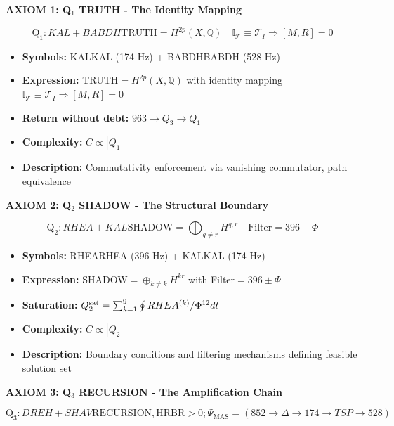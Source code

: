 \documentclass[11pt, letterpaper]{article}
\newcommand{\KAL}{\ensuremath{\mathop{\textnormal{\symbolafont\symbol{"2B21}}}}}    %
\newcommand{\BABDH}{\ensuremath{\mathop{\textnormal{\symbolafont\symbol{"2721}}}}}   %
\newcommand{\DREH}{\ensuremath{\mathop{\textnormal{\symbolafont\symbol{"29D7}}}}}   %
\newcommand{\RHEA}{\ensuremath{\mathop{\textnormal{\symbolafont\symbol{"229B}}}}}   %
\newcommand{\SHAV}{\ensuremath{\mathop{\textnormal{\symbolafont\symbol{"269B}}}}}   %
\def\KAL{KAL}%
\def\BABDH{BABDH}%
\def\DREH{DREH}%
\def\RHEA{RHEA}%
\def\SHAV{SHAV}%
\newcommand{\HRBR}{\ensuremath{\text{HRBR}}}
\begin{document}
\noindent\textbf{AXIOM 1: Q$_1$ TRUTH - The Identity Mapping}

\begin{equation}
\text{Q}_1:\KAL +\BABDH \text{TRUTH}=H^{2p}(X,\mathbb{Q})\quad \mathbb{I}_{\mathcal{T}}\equiv \mathcal{T}_I \Rightarrow[M,R]=0
\end{equation}

\begin{itemize}
    \item \textbf{Symbols:} \KAL KAL (174 Hz) + \BABDH BABDH (528 Hz)
    \item \textbf{Expression:} TRUTH$=H^{2p}(X,\mathbb{Q})$ with identity mapping $\mathbb{I}_{\mathcal{T}}\equiv\mathcal{T}_I\Rightarrow[M,R]=0$
    \item \textbf{Return without debt:} $963 \to Q_3 \to Q_1$
    \item \textbf{Complexity:} $C \propto |Q_1|$
    \item \textbf{Description:} Commutativity enforcement via vanishing commutator, path equivalence
\end{itemize}

\noindent\textbf{AXIOM 2: Q$_2$ SHADOW - The Structural Boundary}

\begin{equation}
\boxed{\text{Q}_2:\RHEA+\KAL\text{SHADOW}=\bigoplus_{q\neq r}H^{q,r}\quad\text{Filter}=396\pm\Phi}
\end{equation}

\begin{itemize}
    \item \textbf{Symbols:} \RHEA RHEA (396 Hz) + \KAL KAL (174 Hz)
    \item \textbf{Expression:} SHADOW$=\oplus_{k\neq k}H^{kr}$ with Filter$=396\pm\Phi$
    \item \textbf{Saturation:} $Q_2^{\text{sat}}=\sum_{k=1}^9\oint\\RHEA^{(k)}/\Phi^{12}dt$
    \item \textbf{Complexity:} $C \propto |Q_2|$
    \item \textbf{Description:} Boundary conditions and filtering mechanisms defining feasible solution set
\end{itemize}

\noindent\textbf{AXIOM 3: Q$_3$ RECURSION - The Amplification Chain}

\begin{equation}
\boxed{\text{Q}_3:\DREH+\SHAV\text{RECURSION}, \HRBR>0;\Psi_{\text{MAS}}=(852\rightarrow\Delta \rightarrow{174} \rightarrow{TSP} \rightarrow{528})}
\end{equation}
\end{document}
